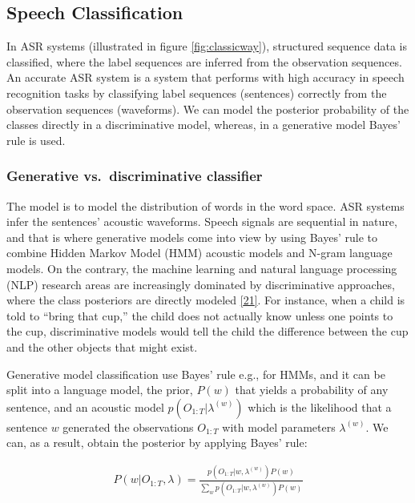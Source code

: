 \documentclass[
  a4paper,
]{article}
\begin{document}
\hypertarget{speech-classification}{%
\subsection{Speech Classification}\label{speech-classification}}

In ASR systems (illustrated in figure \ref{fig:classicway}), structured
sequence data is classified, where the label sequences are inferred from
the observation sequences. An accurate ASR system is a system that
performs with high accuracy in speech recognition tasks by classifying
label sequences (sentences) correctly from the observation sequences
(waveforms). We can model the posterior probability of the classes
directly in a discriminative model, whereas, in a generative model
Bayes' rule is used.

\hypertarget{generative-vs.-discriminative-classifier}{%
\subsubsection{Generative vs.~discriminative
classifier}\label{generative-vs.-discriminative-classifier}}

The model is to model the distribution of words in the word space. ASR
systems infer the sentences' acoustic waveforms. Speech signals are
sequential in nature, and that is where generative models come into view
by using Bayes' rule to combine Hidden Markov Model (HMM) acoustic
models and N-gram language models. On the contrary, the machine learning
and natural language processing (NLP) research areas are increasingly
dominated by discriminative approaches, where the class posteriors are
directly modeled \protect\hyperlink{ref-6296527}{{[}21{]}}. For
instance, when a child is told to ``bring that cup,'' the child does not
actually know unless one points to the cup, discriminative models would
tell the child the difference between the cup and the other objects that
might exist.

Generative model classification use Bayes' rule e.g., for HMMs, and it
can be split into a language model, the prior, \(P(w)\) that yields a
probability of any sentence, and an acoustic model
\(p(O_{1:T}| \lambda^{(w)})\) which is the likelihood that a sentence
\(w\) generated the observations \(O_{1:T}\) with model parameters
\(\lambda^{(w)}\). We can, as a result, obtain the posterior by applying
Bayes' rule:

\begin{align}
P(w|O_{1:T}, \lambda) = \frac{p(O_{1:T}|w, \lambda^{(w)}) P(w)}{\sum_{w}p(O_{1:T}|w, \lambda^{(w)})P(w)}
\end{align}
\end{document}
